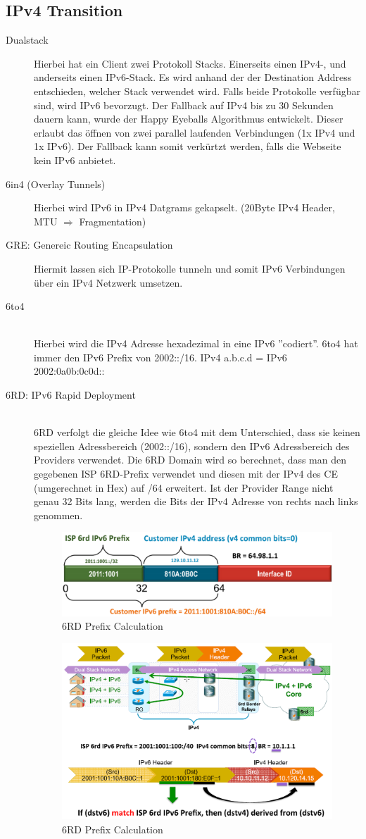 \subsection{IPv4 Transition }
\begin{description}
	\item[Dualstack] Hierbei hat ein Client zwei Protokoll Stacks. Einerseits einen IPv4-, und anderseits einen IPv6-Stack. Es wird anhand der der Destination Address entschieden, welcher Stack verwendet wird. Falls beide Protokolle verfügbar sind, wird IPv6 bevorzugt. Der Fallback auf IPv4 bis zu 30 Sekunden dauern kann, wurde der Happy Eyeballs Algorithmus entwickelt. Dieser erlaubt das öffnen von zwei parallel laufenden Verbindungen (1x IPv4 und 1x IPv6). Der Fallback kann somit verkürtzt werden, falls die Webseite kein IPv6 anbietet.
	\item[6in4 (Overlay Tunnels)] Hierbei wird IPv6 in IPv4 Datgrams gekapselt. (20Byte IPv4 Header, MTU $\Rightarrow$ Fragmentation)
	\item[GRE: Genereic Routing Encapsulation] Hiermit lassen sich IP-Protokolle tunneln und somit IPv6 Verbindungen über ein IPv4 Netzwerk umsetzen.
	\item[6to4] \hfill \\
	Hierbei wird die IPv4 Adresse hexadezimal in eine IPv6 ''codiert''. 6to4 hat immer den IPv6 Prefix von 2002::/16. IPv4 a.b.c.d = IPv6 2002:0a0b:0c0d::
	\item[6RD: IPv6 Rapid Deployment] \hfill \\
	6RD verfolgt die gleiche Idee wie 6to4 mit dem Unterschied, dass sie keinen speziellen Adressbereich (2002::/16), sondern den IPv6 Adressbereich des Providers verwendet. Die 6RD Domain wird so berechnet, dass man den gegebenen ISP 6RD-Prefix verwendet und diesen mit der IPv4 des CE (umgerechnet in Hex) auf /64 erweitert. Ist der Provider Range nicht genau 32 Bits lang, werden die Bits der IPv4 Adresse von rechts nach links genommen.
	\begin{figure}[h]
		\centering
		\includegraphics[width=0.4\linewidth]{images/6rd_address_prefix}
		\caption{6RD Prefix Calculation}
	\end{figure}
	
	\begin{figure}[h]
		\centering
		\includegraphics[width=0.4\linewidth]{images/6rd_transmission}
		\caption{6RD Prefix Calculation}
	\end{figure}

\end{description}

